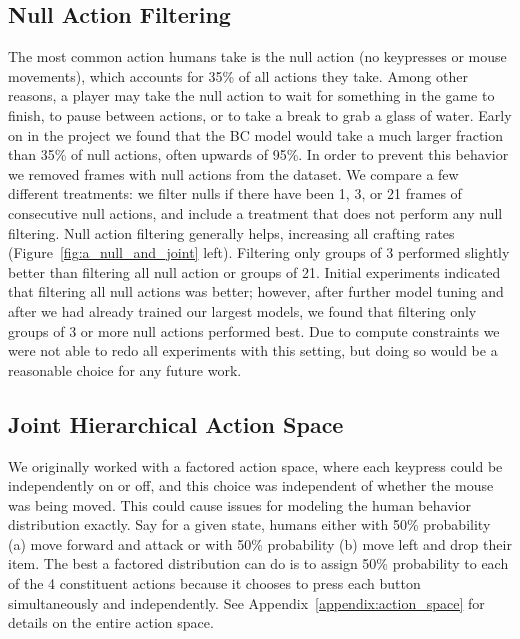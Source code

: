 \subsection{Null Action Filtering}
The most common action humans take is the null action (no keypresses or mouse movements), which accounts for 35\% of all actions they take. Among other reasons, a player may take the null action to wait for something in the game to finish, to pause between actions, or to take a break to grab a glass of water. Early on in the project we found that the BC model would take a much larger fraction than 35\% of null actions, often upwards of 95\%. In order to prevent this behavior we removed frames with null actions from the dataset. We compare a few different treatments: we filter nulls if there have been 1, 3, or 21 frames of consecutive null actions, and include a treatment that does not perform any null filtering. Null action filtering generally helps, increasing all crafting rates (Figure~\ref{fig:a_null_and_joint} left).
Filtering only groups of 3 performed slightly better than filtering all null action or groups of 21. Initial experiments indicated that filtering all null actions was better; however, after further model tuning and after we had already trained our largest models, we found that filtering only groups of 3 or more null actions performed best. Due to compute constraints we were not able to redo all experiments with this setting, but doing so would be a reasonable choice for any future work.

\subsection{Joint Hierarchical Action Space}
We originally worked with a factored action space, where each keypress could be independently on or off, and this choice was independent of whether the mouse was being moved. This could cause issues for modeling the human behavior distribution exactly. Say for a given state, humans either with 50\% probability (a) move forward and attack or with 50\% probability (b) move left and drop their item. The best a factored distribution can do is to assign 50\% probability to each of the 4 constituent actions because it chooses to press each button simultaneously and independently. See Appendix~\ref{appendix:action_space} for details on the entire action space.

